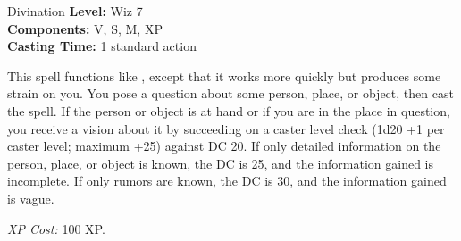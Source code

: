 {Divination}
{
	\textbf{Level:}
	Wiz 7\\
	\textbf{Components:}
	V, S, M, XP\\
	\textbf{Casting Time:}
	1 standard action\\
}
{
	This spell functions like , except that it works more quickly but produces some strain on you. You pose a question about some person, place, or object, then cast the spell. If the person or object is at hand or if you are in the place in question, you receive a vision about it by succeeding on a caster level check (1d20 +1 per caster level; maximum +25) against DC 20. If only detailed information on the person, place, or object is known, the DC is 25, and the information gained is incomplete. If only rumors are known, the DC is 30, and the information gained is vague.

	\textit{XP Cost:}
	100 XP.

}
